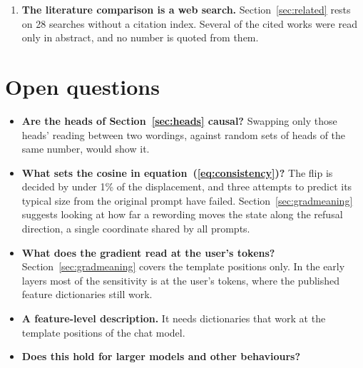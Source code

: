 \documentclass[11pt]{article}
\begin{document}
\begin{enumerate}
\item \textbf{The literature comparison is a web search.} Section~\ref{sec:related} rests on 28 searches without a citation index. Several of the cited works were read only in abstract, and no number is quoted from them.
\end{enumerate}

\section{Open questions}
\label{sec:open}

\begin{itemize}
\item \textbf{Are the heads of Section~\ref{sec:heads} causal?} Swapping only those heads' reading between two wordings, against random sets of heads of the same number, would show it.
\item \textbf{What sets the cosine in equation~(\ref{eq:consistency})?} The flip is decided by under 1\% of the displacement, and three attempts to predict its typical size from the original prompt have failed. Section~\ref{sec:gradmeaning} suggests looking at how far a rewording moves the state along the refusal direction, a single coordinate shared by all prompts.
\item \textbf{What does the gradient read at the user's tokens?} Section~\ref{sec:gradmeaning} covers the template positions only. In the early layers most of the sensitivity is at the user's tokens, where the published feature dictionaries still work.
\item \textbf{A feature-level description.} It needs dictionaries that work at the template positions of the chat model.
\item \textbf{Does this hold for larger models and other behaviours?}
\end{itemize}
\end{document}

